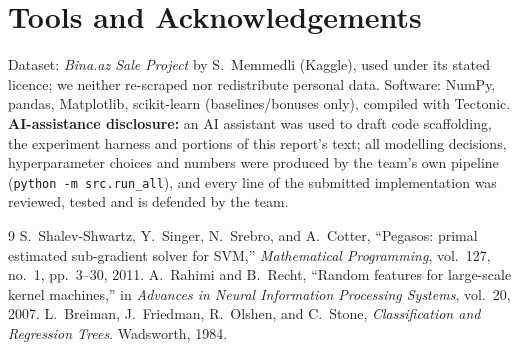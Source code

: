 \documentclass[10pt,twocolumn,a4paper]{article}
\begin{document}
\section*{Tools and Acknowledgements}
Dataset: \emph{Bina.az Sale Project} by S.~Memmedli (Kaggle), used under
its stated licence; we neither re-scraped nor redistribute personal data.
Software: NumPy, pandas, Matplotlib, scikit-learn (baselines/bonuses
only), compiled with Tectonic. \textbf{AI-assistance disclosure:} an AI
assistant was used to draft code scaffolding, the
experiment harness and portions of this report's text; all modelling
decisions, hyperparameter choices and numbers were produced by the
team's own pipeline (\texttt{python -m src.run\_all}), and every line of
the submitted implementation was reviewed, tested and is defended by the
team.

\begin{thebibliography}{9}
S.~Shalev-Shwartz, Y.~Singer, N.~Srebro, and A.~Cotter,
``Pegasos: primal estimated sub-gradient solver for SVM,''
\emph{Mathematical Programming}, vol.~127, no.~1, pp.~3--30, 2011.
A.~Rahimi and B.~Recht, ``Random features for large-scale kernel
machines,'' in \emph{Advances in Neural Information Processing Systems},
vol.~20, 2007.
L.~Breiman, J.~Friedman, R.~Olshen, and C.~Stone,
\emph{Classification and Regression Trees}. Wadsworth, 1984.
\end{thebibliography}
\end{document}
